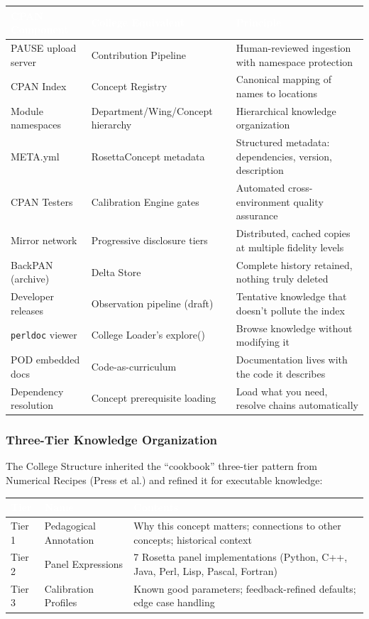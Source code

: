 \documentclass[11pt,letterpaper]{article}
\newcommand{\tableheader}[1]{\textbf{\sffamily\textcolor{white}{#1}}}
\begin{document}
\begin{center}
\begin{tabularx}{\textwidth}{L{4cm}L{4cm}X}
\toprule
{}
\tableheader{CPAN Component} & \tableheader{College Equivalent} & \tableheader{Principle} \\
\midrule
PAUSE upload server & Contribution Pipeline & Human-reviewed ingestion with namespace protection \\
CPAN Index & Concept Registry & Canonical mapping of names to locations \\
Module namespaces & Department/Wing/Concept hierarchy & Hierarchical knowledge organization \\
META.yml & RosettaConcept metadata & Structured metadata: dependencies, version, description \\
CPAN Testers & Calibration Engine gates & Automated cross-environment quality assurance \\
Mirror network & Progressive disclosure tiers & Distributed, cached copies at multiple fidelity levels \\
BackPAN (archive) & Delta Store & Complete history retained, nothing truly deleted \\
Developer releases & Observation pipeline (draft) & Tentative knowledge that doesn't pollute the index \\
\texttt{perldoc} viewer & College Loader's explore() & Browse knowledge without modifying it \\
POD embedded docs & Code-as-curriculum & Documentation lives with the code it describes \\
Dependency resolution & Concept prerequisite loading & Load what you need, resolve chains automatically \\
\bottomrule
\end{tabularx}
\end{center}

\subsubsection{Three-Tier Knowledge Organization}

The College Structure inherited the ``cookbook'' three-tier pattern from Numerical Recipes (Press et al.)
and refined it for executable knowledge:

\begin{center}
\begin{tabularx}{\textwidth}{L{3.5cm}L{3.5cm}X}
\toprule
{}
\tableheader{Tier} & \tableheader{Name} & \tableheader{Contents} \\
\midrule
Tier 1 & Pedagogical Annotation & Why this concept matters; connections to other concepts; historical context \\
Tier 2 & Panel Expressions & 7 Rosetta panel implementations (Python, C++, Java, Perl, Lisp, Pascal, Fortran) \\
Tier 3 & Calibration Profiles & Known good parameters; feedback-refined defaults; edge case handling \\
\bottomrule
\end{tabularx}
\end{center}
\end{document}
